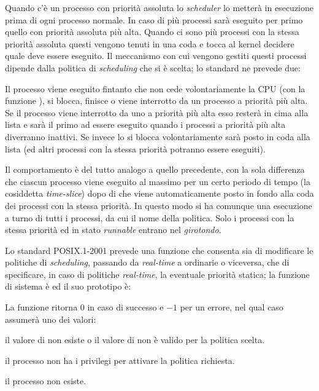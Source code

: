 Quando c'è un processo con priorità assoluta lo \textit{scheduler} lo metterà
in esecuzione prima di ogni processo normale. In caso di più processi sarà
eseguito per primo quello con priorità assoluta più alta. Quando ci sono più
processi con la stessa priorità assoluta questi vengono tenuti in una coda e
tocca al kernel decidere quale deve essere eseguito.  Il meccanismo con cui
vengono gestiti questi processi dipende dalla politica di \textit{scheduling}
che si è scelta; lo standard ne prevede due:
\begin{basedescript}{\desclabelwidth{1.2cm}\desclabelstyle{\nextlinelabel}}
\item[\textit{First In First Out} (FIFO)] Il processo viene eseguito
  fintanto che non cede volontariamente la CPU (con la funzione
  ), si blocca, finisce o viene interrotto da un processo a
  priorità più alta. Se il processo viene interrotto da uno a priorità più
  alta esso resterà in cima alla lista e sarà il primo ad essere eseguito
  quando i processi a priorità più alta diverranno inattivi. Se invece lo si
  blocca volontariamente sarà posto in coda alla lista (ed altri processi con
  la stessa priorità potranno essere eseguiti).
\item[\textit{Round Robin} (RR)] Il comportamento è del tutto analogo a quello
  precedente, con la sola differenza che ciascun processo viene eseguito al
  massimo per un certo periodo di tempo (la cosiddetta \textit{time-slice})
  dopo di che viene automaticamente posto in fondo alla coda dei processi con
  la stessa priorità. In questo modo si ha comunque una esecuzione a turno di
  tutti i processi, da cui il nome della politica. Solo i processi con la
  stessa priorità ed in stato \textit{runnable} entrano nel
  \textsl{girotondo}.
\end{basedescript}

Lo standard POSIX.1-2001 prevede una funzione che consenta sia di modificare
le politiche di \textit{scheduling}, passando da \textit{real-time} a
ordinarie o viceversa, che di specificare, in caso di politiche
\textit{real-time}, la eventuale priorità statica; la funzione di sistema è
 ed il suo prototipo è:

\begin{funcproto}{ 
}
{La funzione ritorna $0$ in caso di successo e $-1$ per un errore, nel qual
caso  assumerà uno dei valori:
\begin{errlist}
    \item[\errcode{EINVAL}] il valore di  non esiste o il
      valore di  non è valido per la politica scelta.
    \item[\errcode{EPERM}] il processo non ha i privilegi per attivare la
      politica richiesta.
    \item[\errcode{ESRCH}] il processo  non esiste.
    \end{errlist}}
\end{funcproto}

